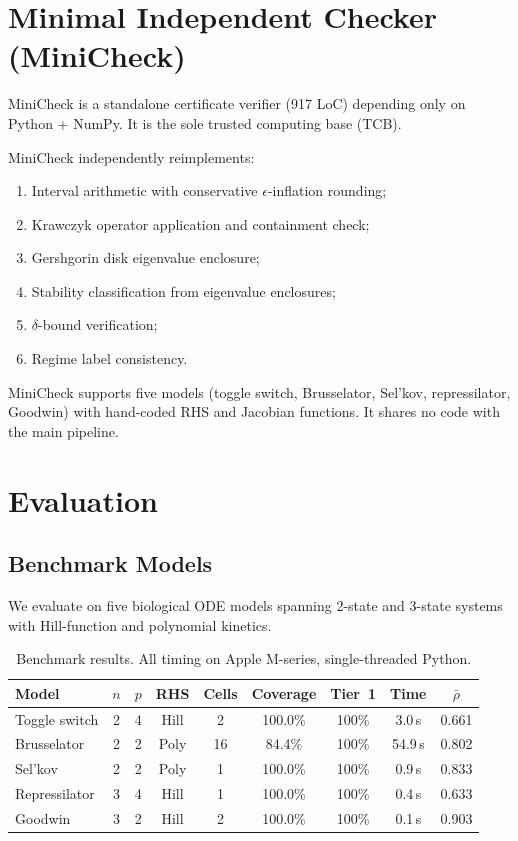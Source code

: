 \documentclass[11pt]{article}
\begin{document}
\section{Minimal Independent Checker (MiniCheck)}
\label{sec:minicheck}

MiniCheck is a standalone certificate verifier (917 LoC) depending only on Python + NumPy.
It is the sole trusted computing base (TCB).

MiniCheck independently reimplements:
\begin{enumerate}[leftmargin=*]
\item Interval arithmetic with conservative $\epsilon$-inflation rounding;
\item Krawczyk operator application and containment check;
\item Gershgorin disk eigenvalue enclosure;
\item Stability classification from eigenvalue enclosures;
\item $\delta$-bound verification;
\item Regime label consistency.
\end{enumerate}

MiniCheck supports five models (toggle switch, Brusselator, Sel'kov, repressilator, Goodwin) with hand-coded RHS and Jacobian functions.
It shares no code with the main pipeline.

\section{Evaluation}
\label{sec:eval}

\subsection{Benchmark Models}

We evaluate on five biological ODE models spanning 2-state and 3-state systems with Hill-function and polynomial kinetics.

\begin{table}[t]
\centering
\caption{Benchmark results. All timing on Apple M-series, single-threaded Python.}
\label{tab:benchmarks}
\small
\begin{tabular}{@{}lcccccccc@{}}
\toprule
Model & $n$ & $p$ & RHS & Cells & Coverage & Tier~1 & Time & $\bar{\rho}$ \\
\midrule
Toggle switch  & 2 & 4 & Hill & 2  & 100.0\% & 100\% & 3.0\,s  & 0.661 \\
Brusselator    & 2 & 2 & Poly & 16 & 84.4\%  & 100\% & 54.9\,s & 0.802 \\
Sel'kov        & 2 & 2 & Poly & 1  & 100.0\% & 100\% & 0.9\,s  & 0.833 \\
Repressilator  & 3 & 4 & Hill & 1  & 100.0\% & 100\% & 0.4\,s  & 0.633 \\
Goodwin        & 3 & 2 & Hill & 2  & 100.0\% & 100\% & 0.1\,s  & 0.903 \\
\bottomrule
\end{tabular}
\end{table}
\end{document}
